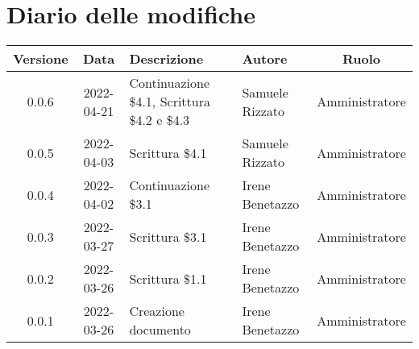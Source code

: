 \section*{Diario delle modifiche}
	\begin{center}
	\renewcommand{\arraystretch}{1.8} %
	\begin{tabular}{ |c|c|m{12em}|m{7em}|c| }
	\hline
	\textbf{Versione} & \textbf{Data} & \textbf{Descrizione} &  \textbf{Autore} &  \textbf{Ruolo} \\ %
	\hline
	0.0.6 & 2022-04-21 & Continuazione \$4.1, Scrittura \$4.2 e \$4.3 & Samuele \newline Rizzato & Amministratore\\ %
	\hline
	0.0.5 & 2022-04-03 & Scrittura \$4.1 & Samuele \newline Rizzato & Amministratore\\
	\hline
	0.0.4 & 2022-04-02 & Continuazione \$3.1 & Irene Benetazzo & Amministratore\\
	\hline
	0.0.3 & 2022-03-27 & Scrittura \$3.1 & Irene Benetazzo & Amministratore\\
	\hline
	0.0.2 & 2022-03-26 & Scrittura \$1.1 & Irene Benetazzo & Amministratore\\
	\hline
    0.0.1 & 2022-03-26 & Creazione documento & Irene Benetazzo & Amministratore\\
	\hline
	\end{tabular}
	\end{center}
	\newpage
